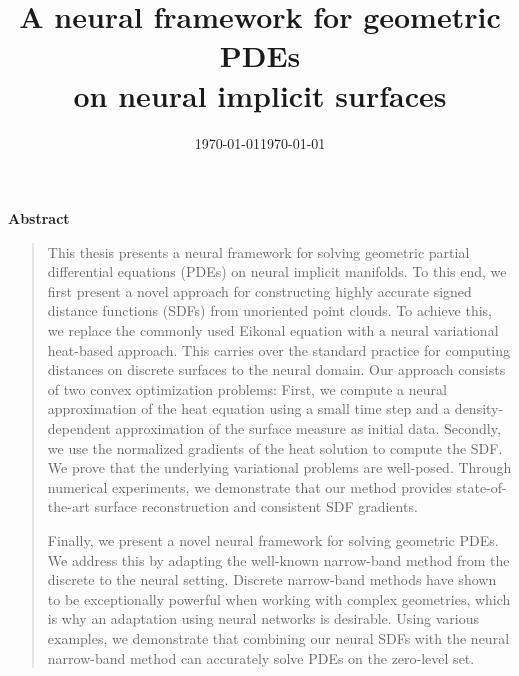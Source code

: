 \documentclass[12pt,openany]{book}
\date{\today}
\title{A neural framework for geometric PDEs\\on neural implicit surfaces}
\date{\today}
\theoremstyle{plainnormal}
\newenvironment{abstract}{
  \cleardoublepage
  \null\vfill
  \begin{center}\bfseries Abstract\end{center}
  \begin{quote}
}{
  \end{quote}
  \vfill\null
  \cleardoublepage
}
\theoremstyle{remark}
\begin{document}
\pagestyle{empty}

\maketitle

\pagestyle{headings}
\setcounter{page}{5}

\begingroup
\let\clearpage\relax

\begin{abstract}This thesis presents a neural framework for solving geometric partial differential equations (PDEs) on neural implicit manifolds. To this end, we first present a novel approach for constructing highly accurate signed distance functions (SDFs) from unoriented point clouds. To achieve this, we replace the commonly used Eikonal equation with a neural variational heat-based approach. This carries over the standard practice for computing distances on discrete surfaces to the neural domain. Our approach consists of two convex optimization problems: First, we compute a neural approximation of the heat equation using a small time step and a density-dependent approximation of the surface measure as initial data. Secondly, we use the normalized gradients of the heat solution to compute the SDF. We prove that the underlying variational problems are well-posed.
Through numerical experiments, we demonstrate that our method provides state-of-the-art surface reconstruction and consistent SDF gradients.\par
Finally, we present a novel neural framework for solving geometric PDEs. We address this by adapting the well-known narrow-band method from the discrete to the neural setting. Discrete narrow-band methods have shown to be exceptionally powerful when working with complex geometries, which is why an adaptation using neural networks is desirable. Using various examples, we demonstrate that combining our neural SDFs with the neural narrow-band method can accurately solve PDEs on the zero-level set.
\end{abstract}
\end{document}
